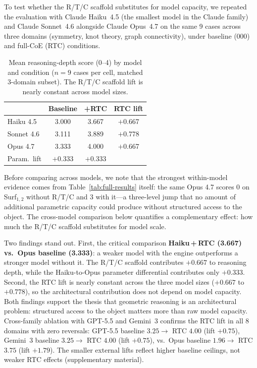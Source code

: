 \documentclass{article}
\begin{document}
To test whether the R/T/C scaffold substitutes for model capacity, we repeated
the evaluation with Claude Haiku~4.5 (the smallest model in the Claude family)
and Claude Sonnet~4.6 alongside Claude Opus~4.7 on the same 9 cases across
three domains (symmetry, knot theory, graph connectivity), under baseline
(000) and full-CoE (RTC) conditions.

\begin{table}[h]
\centering
\caption{Mean reasoning-depth score (0--4) by model and condition ($n{=}9$
cases per cell, matched 3-domain subset). The R/T/C scaffold lift is nearly
constant across model sizes.}
\label{tab:cross-model}
\small
\begin{tabular}{lcc|c}
\toprule
       & Baseline & +RTC & RTC lift \\
\midrule
Haiku 4.5  & 3.000 & 3.667 & $+$0.667 \\
Sonnet 4.6 & 3.111 & 3.889 & $+$0.778 \\
Opus 4.7   & 3.333 & 4.000 & $+$0.667 \\
\midrule
Param.\ lift & $+$0.333 & $+$0.333 & \\
\bottomrule
\end{tabular}
\end{table}

Before comparing across models, we note that the strongest within-model
evidence comes from Table~\ref{tab:full-results} itself: the same Opus 4.7
scores 0 on Surf$_{1,2}$ without R/T/C and 3 with it---a three-level jump that
no amount of additional parametric capacity could produce without structured
access to the object. The cross-model comparison below quantifies a
complementary effect: how much the R/T/C scaffold substitutes for model scale.

Two findings stand out. First, the critical comparison
\textbf{Haiku\,+\,RTC (3.667) vs.\ Opus baseline (3.333)}: a weaker model with
the engine outperforms a stronger model without it. The R/T/C scaffold
contributes $+0.667$ to reasoning depth, while the Haiku-to-Opus parameter
differential contributes only $+0.333$. Second, the RTC lift is nearly
constant across the three model sizes ($+0.667$ to $+0.778$), so the
architectural contribution does not depend on model capacity. Both findings
support the thesis that geometric reasoning is an architectural problem:
structured access to the object matters more than raw model capacity.
Cross-family ablation with GPT-5.5 and Gemini~3 confirms the RTC lift in
all 8 domains with zero reversals: GPT-5.5 baseline $3.25 \to$ RTC $4.00$
(lift $+0.75$), Gemini~3 baseline $3.25 \to$ RTC $4.00$ (lift $+0.75$),
vs.\ Opus baseline $1.96 \to$ RTC $3.75$ (lift $+1.79$). The smaller
external lifts reflect higher baseline ceilings, not weaker RTC effects
(supplementary material).
\end{document}
